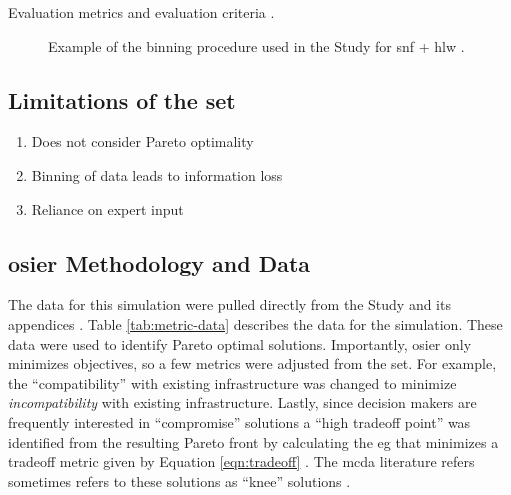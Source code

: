 \begin{table}[htbp!]
    \centering
    \caption{Evaluation metrics and evaluation criteria
    \cite{wigeland_nuclear_2014-2}.}
    \label{tab:evaluation-metrics}
    \resizebox{0.75\columnwidth}{!}{}
\end{table}


\begin{figure}[htbp!]
    \centering
    \resizebox{0.65\columnwidth}{!}{}    
    \caption{Example of the binning procedure used in the Study for \ac{snf} +
    \ac{hlw} \cite{wigeland_nuclear_2014-1}.}
    \label{fig:bin-plot}
\end{figure}

\FloatBarrier

\subsection{Limitations of the \ac{set}}
\begin{enumerate}
    \item Does not consider Pareto optimality
    \item Binning of data leads to information loss
    \item Reliance on expert input
\end{enumerate}

\subsection{\ac{osier} Methodology and Data}

The data for this simulation were pulled directly from the Study and its
appendices
\cite{wigeland_nuclear_2014,wigeland_nuclear_2014-2,wigeland_nuclear_2014-1}.
Table \ref{tab:metric-data} describes the data for the simulation. These data
were used to identify Pareto optimal solutions.  Importantly, \ac{osier} only
minimizes objectives, so a few metrics were adjusted from the \ac{set}. For
example, the ``compatibility'' with existing infrastructure was changed to
minimize \textit{incompatibility} with existing infrastructure. Lastly, since
decision makers are frequently interested in ``compromise'' solutions a ``high
tradeoff point'' was identified from the resulting Pareto front by calculating
the \ac{eg} that minimizes a tradeoff metric given by Equation
\ref{eqn:tradeoff} \cite{rachmawati_multiobjective_2009}. The \ac{mcda}
literature refers sometimes refers to these solutions as ``knee'' solutions
\cite{rachmawati_multiobjective_2009}.

